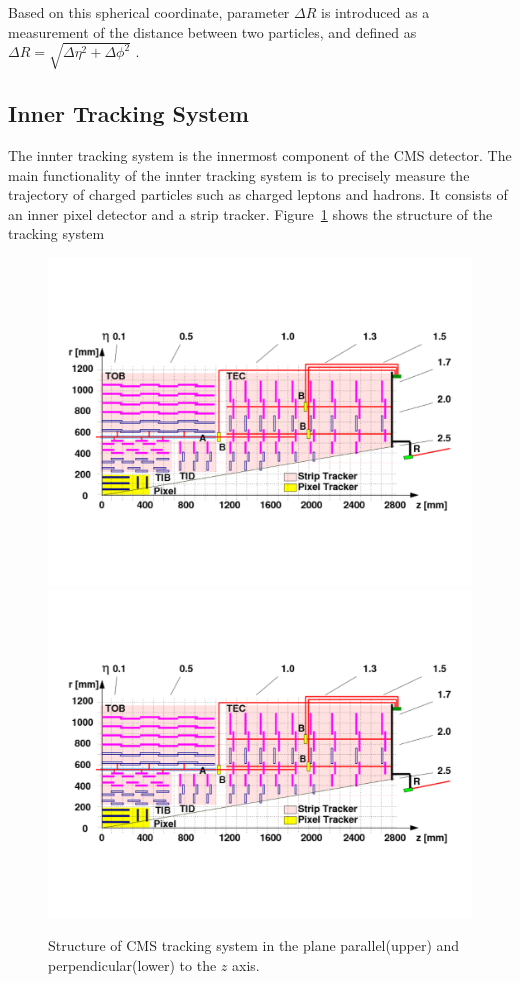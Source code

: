 \vspace{0.3cm}
Based on this spherical coordinate, parameter $\Delta R$ is introduced as a measurement of the distance between two particles, and defined as $\Delta R=\sqrt{\Delta\eta^2 + \Delta\phi^2}$
.
\subsection{Inner Tracking System} 
The innter tracking system\cite{lhc_trackerdesign} is the innermost component of the CMS detector. The main functionality of the innter tracking system is to precisely measure the trajectory of charged particles such as charged leptons and hadrons. It consists of an inner pixel detector and a strip tracker. Figure~\ref{fig:lhc_trackerbarrel} shows the structure of the tracking system
\begin{figure}[htbp]
\begin{center}
\includegraphics[width=0.7\linewidth, page=1]{figures/lhc_trackerbarrel.pdf}
\includegraphics[width=0.7\linewidth, page=2]{figures/lhc_trackerbarrel.pdf}
\caption{Structure of CMS tracking system in the plane parallel(upper) and perpendicular(lower) to the $z$ axis.}
\label{fig:lhc_trackerbarrel}
\end{center}
\end{figure}

